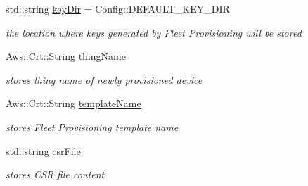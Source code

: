 \begin{DoxyCompactItemize}
\mbox{\label{class_aws_1_1_iot_1_1_device_client_1_1_fleet_provisioning_a567f7f58db121f2b5b0278321da45086}} 
std\+::string \hyperlink{class_aws_1_1_iot_1_1_device_client_1_1_fleet_provisioning_a567f7f58db121f2b5b0278321da45086}{key\+Dir} = Config\+::\+D\+E\+F\+A\+U\+L\+T\+\_\+\+K\+E\+Y\+\_\+\+D\+IR
\begin{DoxyCompactList}\small\item\em the location where keys generated by Fleet Provisioning will be stored \end{DoxyCompactList}\item 
\mbox{\label{class_aws_1_1_iot_1_1_device_client_1_1_fleet_provisioning_a02d85e03d940ee61003b91af0a6cddf7}} 
Aws\+::\+Crt\+::\+String \hyperlink{class_aws_1_1_iot_1_1_device_client_1_1_fleet_provisioning_a02d85e03d940ee61003b91af0a6cddf7}{thing\+Name}
\begin{DoxyCompactList}\small\item\em stores thing name of newly provisioned device \end{DoxyCompactList}\item 
\mbox{\label{class_aws_1_1_iot_1_1_device_client_1_1_fleet_provisioning_a815d738dd64327e5d671119592ef7ada}} 
Aws\+::\+Crt\+::\+String \hyperlink{class_aws_1_1_iot_1_1_device_client_1_1_fleet_provisioning_a815d738dd64327e5d671119592ef7ada}{template\+Name}
\begin{DoxyCompactList}\small\item\em stores Fleet Provisioning template name \end{DoxyCompactList}\item 
\mbox{\label{class_aws_1_1_iot_1_1_device_client_1_1_fleet_provisioning_a02873b53e68e1a63cd1087a07d795dcf}} 
std\+::string \hyperlink{class_aws_1_1_iot_1_1_device_client_1_1_fleet_provisioning_a02873b53e68e1a63cd1087a07d795dcf}{csr\+File}
\begin{DoxyCompactList}\small\item\em stores C\+SR file content \end{DoxyCompactList}\end{DoxyCompactItemize}

